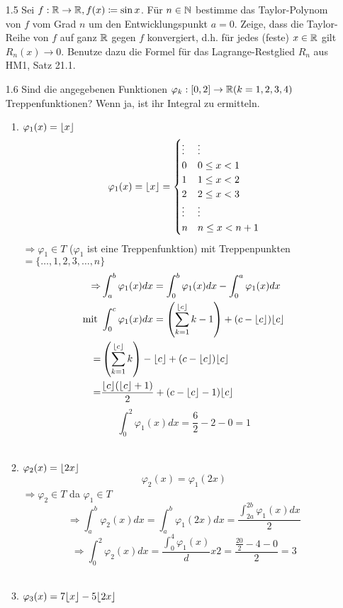 \documentclass{HM}
\begin{document}
	\begin{enumerate}
		\item[1.5] Sei $f:\mathbb{R}\to\mathbb{R}, f(x)\coloneqq\sin x$. Für $n\in\mathbb{N}$ bestimme das Taylor-Polynom von $f$ vom Grad $n$ um den Entwicklungspunkt $a=0$. Zeige, dass die Taylor-Reihe von $f$ auf ganz $\mathbb{R}$ gegen $f$ konvergiert, d.h. für jedes (feste) $x\in\mathbb{R}$ gilt $R_n(x)\to 0$. Benutze dazu die Formel für das Lagrange-Restglied $R_n$ aus HM1, Satz 21.1.

		\item[1.6] Sind die angegebenen Funktionen $\varphi_k:[0,2]\to\mathbb{R}(k=1,2,3,4)$ Treppenfunktionen? Wenn ja, ist ihr Integral zu ermitteln.
		\begin{enumerate}
			\item $\varphi_1(x)=\lfloor x\rfloor$
				$$\varphi_1(x)=\lfloor x\rfloor=\begin{cases}
					\vdots& \vdots\\
					0&0\leq x < 1\\
					1&1\leq x < 2\\
					2&2\leq x < 3\\
					\vdots& \vdots\\
					n&n\leq x < n+1
				\end{cases}$$
				$\Rightarrow \varphi_1\in T$ ($\varphi_1$ ist eine Treppenfunktion) mit Treppenpunkten $= \{\hdots,1,2,3,\hdots,n\}$\\
				\begin{align*}
					\Rightarrow &\int_a^b\varphi_1(x)dx = \int_0^b\varphi_1(x)dx-\int_0^a\varphi_1(x)dx\\
					\text{mit }&\int_0^c\varphi_1(x)dx
					=\left(\sum\limits_{k=1}^{\lfloor c\rfloor}k-1\right) + (c-\lfloor c\rfloor)\lfloor c\rfloor\\
					=&\left(\sum\limits_{k=1}^{\lfloor c\rfloor}k\right) - \lfloor c\rfloor + (c-\lfloor c\rfloor)\lfloor c\rfloor\\
					=&\frac{\lfloor c\rfloor(\lfloor c\rfloor+1)}{2}+(c-\lfloor c\rfloor-1)\lfloor c\rfloor
				\end{align*}
				$$\int_0^2\varphi_1(x)dx=\frac{6}{2}-2-0=1$$\\
			\item $\varphi_2(x)=\lfloor2x\rfloor$
				$$\varphi_2(x)=\varphi_1(2x)$$
				$\Rightarrow \varphi_2\in T$ da $\varphi_1\in T$
				$$\Rightarrow \int_a^b\varphi_2(x)dx=\int_a^b\varphi_1(2x)dx=\frac{\int_{2a}^{2b}\varphi_1(x)dx}{2}$$
				$$\Rightarrow\int_0^2\varphi_2(x)dx=\frac{\int_0^4\varphi_1(x)}dx{2}=\frac{\frac{20}{2}-4-0}{2}=3$$\\
			\item $\varphi_3(x)=7\lfloor x\rfloor-5\lfloor2x\rfloor$

\end{enumerate}
\end{enumerate}
\end{document}
